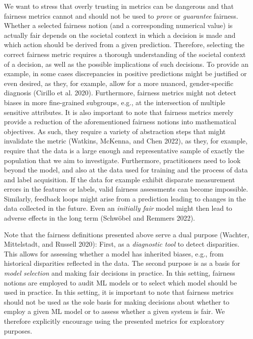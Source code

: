 We want to stress that overly trusting in metrics can be dangerous and that fairness metrics cannot and should not be used to \emph{prove} or \emph{guarantee} fairness.
Whether a selected fairness notion (and a corresponding numerical value) is actually fair depends on the societal context in which a decision is made and which action should be derived from a given prediction.
Therefore, selecting the correct fairness metric requires a thorough understanding of the societal context of a decision, as well as the possible implications of such decisions.
To provide an example, in some cases discrepancies in positive predictions might be justified or even desired, as they, for example, allow for a more nuanced, gender-specific diagnosis (Cirillo et al. 2020).
Furthermore, fairness metrics might not detect biases in more fine-grained subgroups, e.g., at the intersection of multiple sensitive attributes.
It is also important to note that fairness metrics merely provide a reduction of the aforementioned fairness notions into mathematical objectives.
As such, they require a variety of abstraction steps that might invalidate the metric (Watkins, McKenna, and Chen 2022), as they, for example, require that the data is a large enough and representative sample of exactly the population that we aim to investigate.
Furthermore, practitioners need to look beyond the model, and also at the data used for training and the process of data and label acquisition.
If the data for example exhibit disparate measurement errors in the features or labels, valid fairness assessments can become impossible.
Similarly, feedback loops might arise from a prediction leading to changes in the data collected in the future.
Even an \emph{initially fair} model might then lead to adverse effects in the long term (Schwöbel and Remmers 2022).

Note that the fairness definitions presented above serve a dual purpose (Wachter, Mittelstadt, and Russell 2020):
First, as a \emph{diagnostic tool} to detect disparities.
This allows for assessing whether a model has inherited biases, e.g., from historical disparities reflected in the data.
The second purpose is as a basis for \emph{model selection} and making fair decisions in practice.
In this setting, fairness notions are employed to audit ML models or to select which model should be used in practice.
In this setting, it is important to note that fairness metrics should not be used as the sole basis for making decisions about whether to employ a given ML model or to assess whether a given system is fair.
We therefore explicitly encourage using the presented metrics for exploratory purposes.

